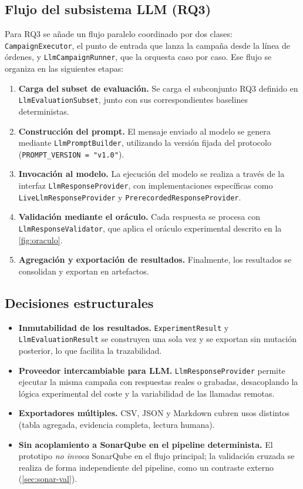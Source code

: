 \subsection{Flujo del subsistema LLM (RQ3)}

Para RQ3 se añade un flujo paralelo coordinado por dos clases:
\texttt{CampaignExecutor}, el punto de entrada que lanza la campaña desde la
línea de órdenes, y \texttt{LlmCampaignRunner}, que la orquesta caso por caso.
Ese flujo se organiza en las siguientes etapas:

\begin{enumerate}
    \item \textbf{Carga del subset de evaluación.}  
    Se carga el subconjunto RQ3 definido en \texttt{LlmEvaluationSubset}, junto con sus correspondientes baselines deterministas.

    \item \textbf{Construcción del prompt.}  
    El mensaje enviado al modelo se genera mediante \texttt{LlmPromptBuilder}, utilizando la versión fijada del protocolo (\lstinline|PROMPT_VERSION = "v1.0"|).

    \item \textbf{Invocación al modelo.}  
    La ejecución del modelo se realiza a través de la interfaz \texttt{LlmResponseProvider}, con implementaciones específicas como \texttt{LiveLlmResponseProvider} y \texttt{PrerecordedResponseProvider}.

    \item \textbf{Validación mediante el oráculo.}  
    Cada respuesta se procesa con \texttt{LlmResponseValidator}, que aplica el oráculo experimental descrito en la \autoref{fig:oraculo}.

    \item \textbf{Agregación y exportación de resultados.}  
    Finalmente, los resultados se consolidan y exportan en artefactos.
\end{enumerate}

\subsection{Decisiones estructurales}
\begin{itemize}
  \item \textbf{Inmutabilidad de los resultados.} \texttt{ExperimentResult}
  y \texttt{LlmEvaluationResult} se construyen una sola vez y se exportan
  sin mutación posterior, lo que facilita la trazabilidad.
  \item \textbf{Proveedor intercambiable para LLM.}
  \texttt{LlmResponseProvider} permite ejecutar la misma campaña con
  respuestas reales o grabadas, desacoplando la lógica experimental del
  coste y la variabilidad de las llamadas remotas.
  \item \textbf{Exportadores múltiples.} CSV, JSON y Markdown cubren usos
  distintos (tabla agregada, evidencia completa, lectura humana).
  \item \textbf{Sin acoplamiento a SonarQube en el pipeline determinista.}
  El prototipo \emph{no invoca} SonarQube en el flujo principal; la
  validación cruzada se realiza de forma independiente del pipeline, como un
  contraste externo (\autoref{sec:sonar-val}).
\end{itemize}
